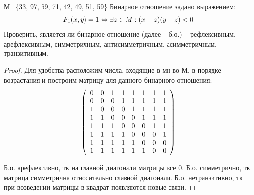 
\renewcommand*{\proofname}{Решение}

\begin{problem}
    
    М=\{33, 97, 69, 71, 42, 49, 51, 59\}\newline
	Бинарное отношение задано выражением: \newline
   $$ F_{1}(x,y)=1\Leftrightarrow\exists z\in M:(x-z)(y-z)<0\newline$$
 \newline
 Проверить, является ли бинарное отношение (далее -- б.о.) -- рефлексивным, арефлексивным, симметричным, антисимметричным, асимметричным, транзитивным.
\end{problem}

\begin{proof}
    Для удобства расположим числа, входящие в мн-во М, в порядке возрастания и построим матрицу для данного бинарного отношения:
	$$ \left( \begin{array}{c c c c c c c c } 
 
 0 & 0 & 1 & 1 & 1 & 1 & 1 & 1 \\ 

  0 & 0 & 0 & 1 & 1 & 1 & 1 & 1 \\

 1 & 0 & 0 & 0 & 1 & 1 & 1 & 1 \\
 
 1 & 1 & 0 & 0 & 0 & 1 & 1 & 1 \\
 
 1 & 1 & 1 & 0 & 0 & 0 & 1 & 1 \\
 
 1 & 1 & 1 & 1 & 0 & 0 & 0 & 1 \\
 
 1 & 1 & 1 & 1 & 1 & 0 & 0 & 0 \\
 
 1 & 1 & 1 & 1 & 1 & 1 & 0 & 0 \end {array} \right) $$

    Б.о. арефлексивно, тк на главной диагонали матрицы все 0.
    \newline
    Б.о. симметрично, тк матрица симметрична относительно главной диагонали.
    \newline
    Б.о. нетранзитивно, тк при возведении матрицы в квадрат появляются новые связи.
    \newline

\end{proof}

